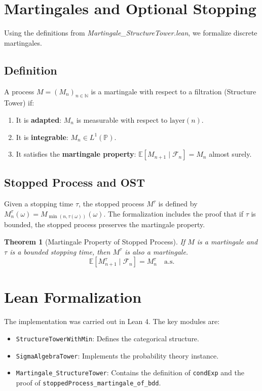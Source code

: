 \documentclass[11pt, a4paper]{article}
\theoremstyle{definition}
\theoremstyle{plain}
\newtheorem{theorem}[definition]{Theorem}
\newcommand{\N}{\mathbb{N}}
\newcommand{\E}{\mathbb{E}}
\renewcommand{\P}{\mathbb{P}}
\newcommand{\F}{\mathcal{F}}
\begin{document}
\section{Martingales and Optional Stopping}

Using the definitions from \textit{Martingale\_StructureTower.lean}, we formalize discrete martingales.

\subsection{Definition}
A process $M = (M_n)_{n \in \N}$ is a martingale with respect to a filtration (Structure Tower) if:
\begin{enumerate}
    \item It is \textbf{adapted}: $M_n$ is measurable with respect to $\mathrm{layer}(n)$.
    \item It is \textbf{integrable}: $M_n \in L^1(\P)$.
    \item It satisfies the \textbf{martingale property}: $\E[M_{n+1} \mid \F_n] = M_n$ almost surely.
\end{enumerate}

\subsection{Stopped Process and OST}
Given a stopping time $\tau$, the stopped process $M^\tau$ is defined by $M^\tau_n(\omega) = M_{\min(n, \tau(\omega))}(\omega)$.
The formalization includes the proof that if $\tau$ is bounded, the stopped process preserves the martingale property.

\begin{theorem}[Martingale Property of Stopped Process]
If $M$ is a martingale and $\tau$ is a bounded stopping time, then $M^\tau$ is also a martingale.
\[
\E[M^\tau_{n+1} \mid \F_n] = M^\tau_n \quad \text{a.s.}
\]
\end{theorem}

\section{Lean Formalization}

The implementation was carried out in Lean 4. The key modules are:

\begin{itemize}
    \item \texttt{StructureTowerWithMin}: Defines the categorical structure.
    \item \texttt{SigmaAlgebraTower}: Implements the probability theory instance.
    \item \texttt{Martingale\_StructureTower}: Contains the definition of \texttt{condExp} and the proof of \texttt{stoppedProcess\_martingale\_of\_bdd}.
\end{itemize}
\end{document}
